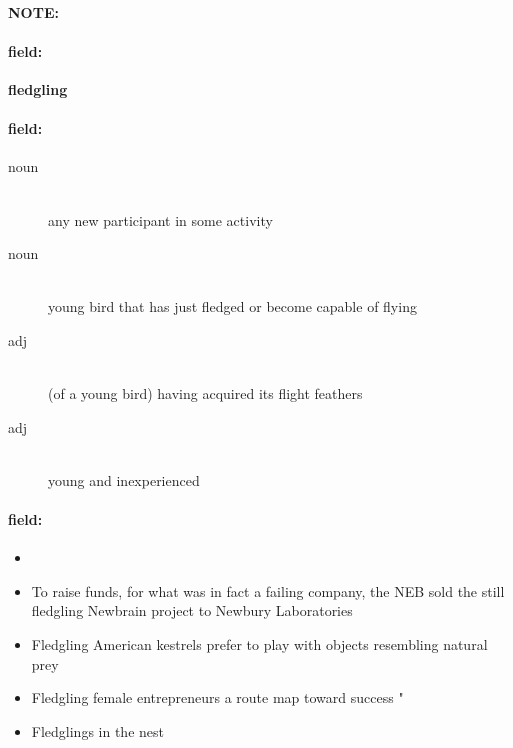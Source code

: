 \documentclass[12pt]{article}
\newenvironment{note}{\paragraph{NOTE:}}{}
\newenvironment{field}{\paragraph{field:}}{}
\begin{document}
\begin{note}
\begin{field}
\textbf{\large fledgling}
\end{field}


\begin{field}
\begin{description}
\item[noun] \hfill \\ 
any new participant in some activity

\item[noun] \hfill \\ 
young bird that has just fledged or become capable of flying

\item[adj] \hfill \\ 
(of a young bird) having acquired its flight feathers

\item[adj] \hfill \\ 
young and inexperienced

\end{description}
\end{field}

\begin{field}
\begin{itemize}
\item 
\item To raise funds, for what was in fact a failing company, the NEB sold the still fledgling Newbrain project to Newbury Laboratories
\item Fledgling American kestrels prefer to play with objects resembling natural prey
\item Fledgling female entrepreneurs a route map toward success " 
\item Fledglings in the nest
\end{itemize}
\end{field}
\end{note}
\end{document}

